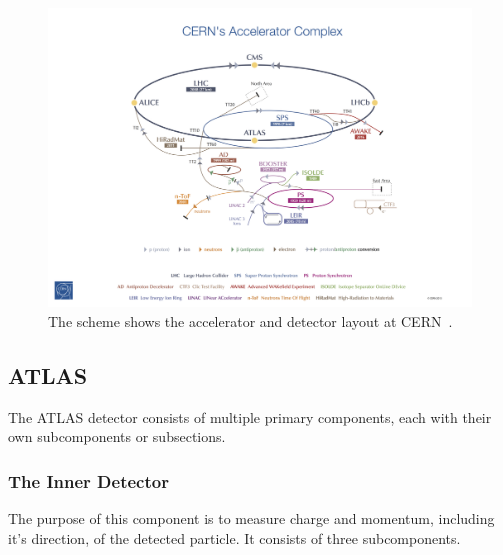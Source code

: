 \documentclass[12pt,a4paper]{article}
\numberwithin{equation}{section}
\begin{document}
\begin{figure}[H]
	\includegraphics[width=\linewidth]{figures/cern.jpg}
	\caption{The scheme shows the accelerator and detector layout at
    CERN~\cite{Haffner:1621894}.}\label{fig:lhc}
\end{figure}


\subsection{ATLAS}


The ATLAS detector consists of multiple primary components, each with their own
subcomponents or subsections.

\subsubsection{The Inner Detector}

The purpose of this component is to measure charge and momentum, including it's
direction, of the detected particle. It consists of three subcomponents. 
\end{document}
